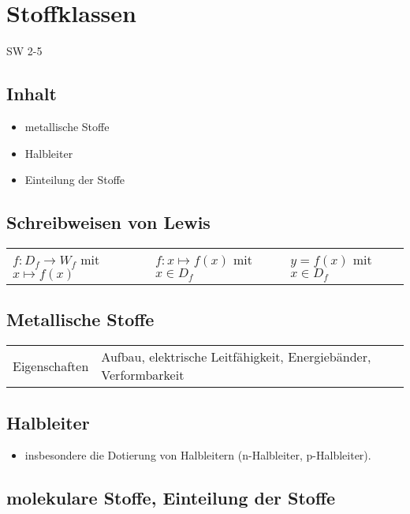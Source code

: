 \section{Stoffklassen}{SW 2-5}

\subsection{Inhalt}
\begin{itemize}
\item metallische Stoffe
\item Halbleiter
\item Einteilung der Stoffe
\end{itemize}

\subsection{Schreibweisen von Lewis} 

\begin{tabular}{lll}
    $f: D_f \rightarrow W_f$ mit $x \mapsto f(x)$ & $f: x \mapsto f(x)$ mit $x \in D_f$ & $y = f(x)$ mit $x \in D_f$ 
\end{tabular}


\subsection{Metallische Stoffe}

\begin{tabular}{ll}
    Eigenschaften & Aufbau, elektrische Leitfähigkeit, Energiebänder, Verformbarkeit\\
\end{tabular}
        

\subsection{Halbleiter}
\begin{itemize}
\item insbesondere die Dotierung von Halbleitern (n-Halbleiter, p-Halbleiter). \\
\end{itemize}

\subsection{molekulare Stoffe, Einteilung der Stoffe}
